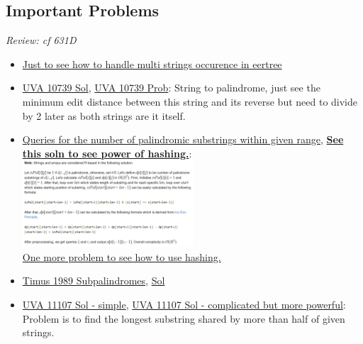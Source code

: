 \documentclass[8pt, a4paper, oneside, twocolumn]{extarticle}
\begin{document}
\subsection{Important Problems}
\textit{Review: cf 631D}
\begin{itemize}
    \item \href{https://github.com/sourabhxyz/Timus/blob/master/2059_Not_common_palindromes.cpp}{Just to see how to handle multi strings occurence in eertree}
	\item \href {https://github.com/sourabhxyz/Competitive-Programming/blob/master/UVA_10739.cpp}{UVA 10739 Sol}, \href {https://uva.onlinejudge.org/external/107/10739.pdf}{UVA 10739 Prob}: String to palindrome, just see the minimum edit distance between this string and its reverse but need to divide by 2 later as both strings are it itself.	
	\item \href {https://codeforces.com/contest/245/problem/H}{Queries for the number of palindromic substrings within given range}, \href {https://github.com/sourabhxyz/Competitive-Programming/blob/master/IMP%20QUES/Suffix%20String%20Structure/Hash/245H%20-%20Queries%20for%20Number%20of%20Palindromes.cpp}{\textbf {See this soln to see power of hashing.}}: 
    \\\includegraphics[width=0.5\textwidth,height=0.5\textheight,keepaspectratio]{assets/palsub} 	
    \\\href {https://github.com/sourabhxyz/Competitive-Programming/blob/master/IMP%20QUES/Suffix%20String%20Structure/Hash/514C%20-%20Watto%20And%20Mechanism.cpp}{One more problem to see how to use hashing.}
    \item \href{http://acm.timus.ru/problem.aspx?space=1&num=1989}{Timus 1989 Subpalindromes}, \href{https://github.com/sourabhxyz/Competitive-Programming/blob/master/timus/1989.cpp}{Sol}
	\item \href {https://github.com/sourabhxyz/Competitive-Programming/blob/master/HimanshuSA11107.cpp}{UVA 11107 Sol - simple}, \href {https://github.com/sourabhxyz/Competitive-Programming/blob/master/HimanshuSA11107.cpp}{UVA 11107 Sol - complicated but more powerful}: Problem is to find the longest substring shared by more than half of given strings.	
\end{itemize}
\end{document}
